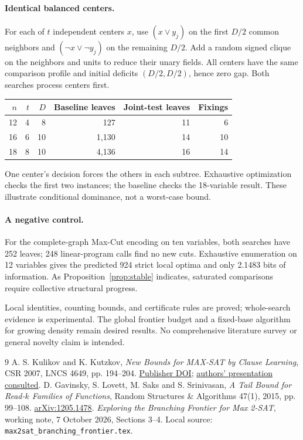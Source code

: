 \documentclass[11pt,a4paper]{article}
\theoremstyle{definition}
\theoremstyle{remark}
\begin{document}
\paragraph{Identical balanced centers.}
For each of $t$ independent centers $x$, use $(x\vee y_j)$ on the first
$D/2$ common neighbors and $(\neg x\vee\neg y_j)$ on the remaining $D/2$.
Add a random signed clique on the neighbors and units to reduce their
unary fields. All centers have the same comparison profile and initial
deficits $(D/2,D/2)$, hence zero gap. Both searches process centers first.
\begin{center}
\begin{tabular}{rrrrrr}
\toprule
$n$ & $t$ & $D$ & Baseline leaves & Joint-test leaves & Fixings\\
\midrule
12 & 4 & 8 & 127 & 11 & 6\\
16 & 6 & 10 & 1,130 & 14 & 10\\
18 & 8 & 10 & 4,136 & 16 & 14\\
\bottomrule
\end{tabular}
\end{center}
One center's decision forces the others in each subtree. Exhaustive
optimization checks the first two instances; the baseline checks the
18-variable result. These illustrate conditional dominance, not a
worst-case bound.

\paragraph{A negative control.}
For the complete-graph Max-Cut encoding on ten variables, both searches
have 252 leaves; 248 linear-program calls find no new cuts. Exhaustive
enumeration on 12 variables gives the predicted 924 strict local optima
and only 2.1483 bits of information. As Proposition~\ref{prop:stable}
indicates, saturated comparisons require collective structural progress.

Local identities, counting bounds, and certificate rules are proved;
whole-search evidence is experimental. The global frontier budget and a
fixed-base algorithm for growing density remain desired results. No
comprehensive literature survey or general novelty claim is intended.

\begin{thebibliography}{9}
\small
{}
A. S. Kulikov and K. Kutzkov,
\emph{New Bounds for MAX-SAT by Clause Learning}, CSR 2007,
LNCS 4649, pp. 194--204.
\href{https://doi.org/10.1007/978-3-540-74510-5_21}{Publisher DOI};
\href{https://pdfs.semanticscholar.org/45e9/3f8020eea4fea5a70c624e149e6a9b275a23.pdf}{authors' presentation consulted}.
D. Gavinsky, S. Lovett, M. Saks and S. Srinivasan,
\emph{A Tail Bound for Read-$k$ Families of Functions},
Random Structures \& Algorithms 47(1), 2015, pp. 99--108.
\href{https://arxiv.org/abs/1205.1478}{arXiv:1205.1478}.
\emph{Exploring the Branching Frontier for Max 2-SAT},
working note, 7 October 2026, Sections 3--4.
Local source: \texttt{max2sat\_branching\_frontier.tex}.
\end{thebibliography}
\end{document}
